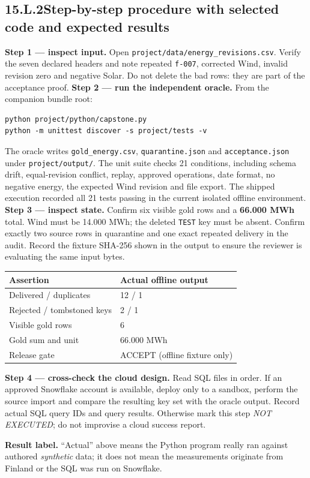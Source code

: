 \documentclass[11pt,twoside]{article}
\newcommand{\topic}[2]{\subsection*{#1\quad #2}}
\begin{document}
\newpage

\topic{15.L.2}{Step-by-step procedure with selected code and expected results}
\textbf{Step 1 --- inspect input.} Open \texttt{project/data/energy\_revisions.csv}. Verify the seven declared headers and note repeated \texttt{f-007}, corrected Wind, invalid revision zero and negative Solar. Do not delete the bad rows: they are part of the acceptance proof.
\textbf{Step 2 --- run the independent oracle.} From the companion bundle root:
\begin{lstlisting}
python project/python/capstone.py
python -m unittest discover -s project/tests -v
\end{lstlisting}
The oracle writes \texttt{gold\_energy.csv}, \texttt{quarantine.json} and \texttt{acceptance.json} under \texttt{project/output/}. The unit suite checks 21 conditions, including schema drift, equal-revision conflict, replay, approved operations, date format, no negative energy, the expected Wind revision and file export. The shipped execution recorded all 21 tests passing in the current isolated offline environment.
\textbf{Step 3 --- inspect state.} Confirm six visible gold rows and a \textbf{66.000 MWh} total. Wind must be 14.000 MWh; the deleted \texttt{TEST} key must be absent. Confirm exactly two source rows in quarantine and one exact repeated delivery in the audit. Record the fixture SHA-256 shown in the output to ensure the reviewer is evaluating the same input bytes.
\begin{center}\small\begin{tabularx}{\linewidth}{@{}p{41mm}X@{}}\toprule
Assertion & Actual offline output\\\midrule
Delivered / duplicates & 12 / 1\\
Rejected / tombstoned keys & 2 / 1\\
Visible gold rows & 6\\
Gold sum and unit & 66.000 MWh\\
Release gate & ACCEPT (offline fixture only)\\\bottomrule\end{tabularx}\end{center}
\textbf{Step 4 --- cross-check the cloud design.} Read SQL files in order. If an approved Snowflake account is available, deploy only to a sandbox, perform the source import and compare the resulting key set with the oracle output. Record actual SQL query IDs and query results. Otherwise mark this step \emph{NOT EXECUTED}; do not improvise a cloud success report.
\begin{insight}\textbf{Result label.} ``Actual'' above means the Python program really ran against authored \emph{synthetic} data; it does not mean the measurements originate from Finland or the SQL was run on Snowflake.\end{insight}
\end{document}
